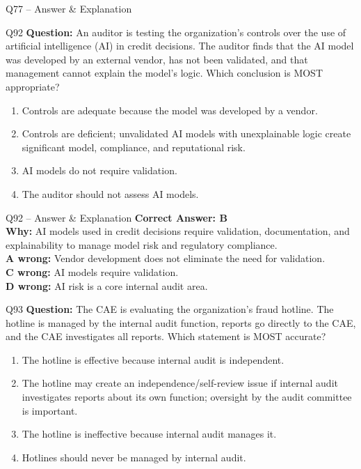 \documentclass[aspectratio=169,10pt]{beamer}
\begin{document}
\begin{frame}[t]{Q77 -- Answer \& Explanation}
	\begin{frame}[t]{Q92}
		\small
		\textbf{Question:} An auditor is testing the organization's controls over the use of artificial intelligence (AI) in credit decisions. The auditor finds that the AI model was developed by an external vendor, has not been validated, and that management cannot explain the model's logic. Which conclusion is MOST appropriate?
		\begin{enumerate}[label=\Alph*.,itemsep=1pt,topsep=2pt]
			\item Controls are adequate because the model was developed by a vendor.
			\item Controls are deficient; unvalidated AI models with unexplainable logic create significant model, compliance, and reputational risk.
			\item AI models do not require validation.
			\item The auditor should not assess AI models.
		\end{enumerate}
	\end{frame}
	
	\begin{frame}[t]{Q92 -- Answer \& Explanation}
		\small
		\textbf{Correct Answer: B} \\[4pt]
		\textbf{Why:} AI models used in credit decisions require validation, documentation, and explainability to manage model risk and regulatory compliance. \\[4pt]
		\textbf{A wrong:} Vendor development does not eliminate the need for validation. \\[2pt]
		\textbf{C wrong:} AI models require validation. \\[2pt]
		\textbf{D wrong:} AI risk is a core internal audit area.
	\end{frame}
	
	\begin{frame}[t]{Q93}
		\small
		\textbf{Question:} The CAE is evaluating the organization's fraud hotline. The hotline is managed by the internal audit function, reports go directly to the CAE, and the CAE investigates all reports. Which statement is MOST accurate?
		\begin{enumerate}[label=\Alph*.,itemsep=1pt,topsep=2pt]
			\item The hotline is effective because internal audit is independent.
			\item The hotline may create an independence/self-review issue if internal audit investigates reports about its own function; oversight by the audit committee is important.
			\item The hotline is ineffective because internal audit manages it.
			\item Hotlines should never be managed by internal audit.
		\end{enumerate}
	\end{frame}
	

\end{frame}
\end{document}
